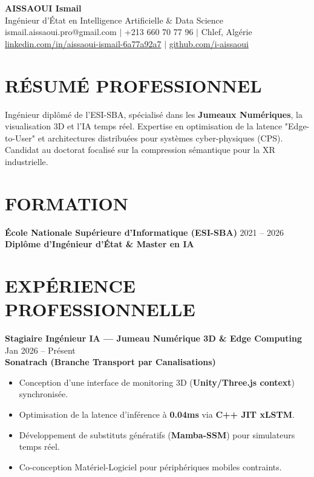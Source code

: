 \documentclass[a4paper,11pt]{article}
\begin{document}
\begin{center}
    {\Huge\bfseries\color{titleblue} AISSAOUI Ismail}\\[4pt]
    {\Large Ingénieur d'État en Intelligence Artificielle \& Data Science}\\[6pt]
    ismail.aissaoui.pro@gmail.com $|$ +213 660 70 77 96 $|$ Chlef, Algérie \\
    \href{https://linkedin.com/in/aissaoui-ismail-6a77a92a7}{linkedin.com/in/aissaoui-ismail-6a77a92a7} $|$ \href{https://github.com/i-aissaoui}{github.com/i-aissaoui}
\end{center}

\section{RÉSUMÉ PROFESSIONNEL}
Ingénieur diplômé de l'ESI-SBA, spécialisé dans les \textbf{Jumeaux Numériques}, la visualisation 3D et l'IA temps réel. Expertise en optimisation de la latence "Edge-to-User" et architectures distribuées pour systèmes cyber-physiques (CPS). Candidat au doctorat focalisé sur la compression sémantique pour la XR industrielle.

\section{FORMATION}
\textbf{École Nationale Supérieure d’Informatique (ESI-SBA)} \hfill 2021 -- 2026 \\
\textbf{Diplôme d'Ingénieur d'État \& Master en IA}

\section{EXPÉRIENCE PROFESSIONNELLE}
\textbf{Stagiaire Ingénieur IA — Jumeau Numérique 3D \& Edge Computing} \hfill Jan 2026 -- Présent \\
\textbf{Sonatrach (Branche Transport par Canalisations)} \\
\begin{itemize}
    \item Conception d'une interface de monitoring 3D (\textbf{Unity/Three.js context}) synchronisée.
    \item Optimisation de la latence d'inférence à \textbf{0.04ms} via \textbf{C++ JIT xLSTM}.
    \item Développement de substituts génératifs (\textbf{Mamba-SSM}) pour simulateurs temps réel.
    \item Co-conception Matériel-Logiciel pour périphériques mobiles contraints.
\end{itemize}
\end{document}
